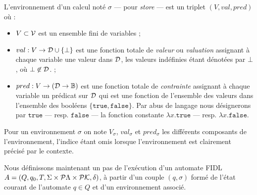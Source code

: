 \begin{definition}[Environnement]
L'environnement d'un calcul not\'e $\sigma$ --- pour \emph{store}  --- est
un triplet $(V,val,pred)$ o\`u :
\begin{itemize}
  \item $V\subset \cal V$ est un ensemble fini de variables ;
\item $val : V\rightarrow {\cal D}\cup \{\bot\}$ est une fonction
  totale de \emph{valeur} ou \emph{valuation} assignant \`a chaque variable
  une valeur dans $\cal D$, les valeurs ind\'efinies
  \'etant d\'enot\'ees par $\bot$, o\`u $\bot \not\in {\cal
  D}$.  ;
\item $pred: V\rightarrow({\cal D}\rightarrow
  \mathbb{B})$ est une fonction totale de \emph{contrainte}
  assignant \`a chaque variable un pr\'edicat sur ${\cal D}$ qui est
  une fonction de l'ensemble des valeurs dans l'ensemble des
  bool\'eens $\{\mathtt{true},\mathtt{false}\}$. Par abus de langage
  nous d\'esignerons par $\mathtt{true}$ --- resp. $\mathtt{false}$
  --- la fonction constante  $\lambda x.\mathtt{true}$ --- resp.  $\lambda x.\mathtt{false}$.
\end{itemize}
Pour un environnement $\sigma$ on note $V_\sigma$, $val_\sigma$ et
$pred_\sigma$ les diff\'erents composants de l'environnement,
l'indice \'etant omis lorsque l'environnement est clairement
pr\'ecis\'e par le contexte.
\end{definition}

Nous d\'efinissons maintenant un pas de l'ex\'ecution d'un automate
\textsf{FIDL} $A=(Q,q_0,T,\Sigma \times{}{\cal P}\Lambda
\times{}{\cal P}\mathcal{K},\delta)$, \`a partir d'un couple $(q,\sigma)$
form\'e de l'\'etat courant de
l'automate $q\in Q$ et d'un environnement associ\'e.

